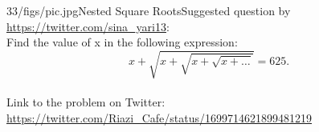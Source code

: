 \begin{problem}{33/figs/pic.jpg}{Nested Square Roots}Suggested question by \url{https://twitter.com/sina_yari13}:\\[0.2cm]
	Find the value of x in the following expression: $$ x + \sqrt{x + \sqrt{x + \sqrt{x + \ldots}}} = 625. $$\\[0.2cm] Link to the problem on Twitter: \url{https://twitter.com/Riazi_Cafe/status/1699714621899481219}\end{problem}